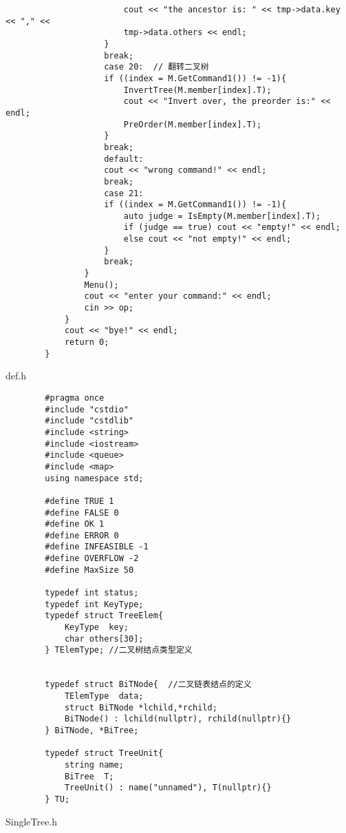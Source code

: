 \documentclass[supercite]{Experimental_Report}
\begin{document}
\begin{lstlisting}
						cout << "the ancestor is: " << tmp->data.key << "," << 
						tmp->data.others << endl;
					}
					break;
					case 20:  // 翻转二叉树
					if ((index = M.GetCommand1()) != -1){
						InvertTree(M.member[index].T);
						cout << "Invert over, the preorder is:" << endl;
						PreOrder(M.member[index].T);
					}
					break;
					default:
					cout << "wrong command!" << endl;
					break;
					case 21:
					if ((index = M.GetCommand1()) != -1){
						auto judge = IsEmpty(M.member[index].T);
						if (judge == true) cout << "empty!" << endl;
						else cout << "not empty!" << endl;
					}
					break;
				}
				Menu();
				cout << "enter your command:" << endl;
				cin >> op;
			}
			cout << "bye!" << endl;
			return 0;
		}
	\end{lstlisting}
	def.h
	\begin{lstlisting}
		#pragma once
		#include "cstdio"
		#include "cstdlib"
		#include <string>
		#include <iostream>
		#include <queue>
		#include <map>
		using namespace std;
		
		#define TRUE 1
		#define FALSE 0
		#define OK 1
		#define ERROR 0
		#define INFEASIBLE -1
		#define OVERFLOW -2
		#define MaxSize 50
		
		typedef int status;
		typedef int KeyType;
		typedef struct TreeElem{
			KeyType  key;
			char others[30];
		} TElemType; //二叉树结点类型定义
		
		
		typedef struct BiTNode{  //二叉链表结点的定义
			TElemType  data;
			struct BiTNode *lchild,*rchild;
			BiTNode() : lchild(nullptr), rchild(nullptr){}
		} BiTNode, *BiTree;
		
		typedef struct TreeUnit{
			string name;
			BiTree  T;
			TreeUnit() : name("unnamed"), T(nullptr){}
		} TU;
	\end{lstlisting}
	SingleTree.h	
\end{document}
